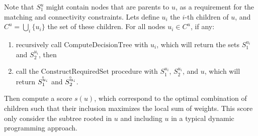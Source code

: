 			Note that $S^u_1$ might contain nodes that are parents to $u$, as a requirement for the matching and connectivity constraints.
			Lets define $u_i$ the $i$-th children of $u$, and $C^u = \bigcup\limits_i{\{u_i\}}$ the set of these children. %
			For all nodes $u_i \in C^u$, if any:
			\begin{enumerate}
				\item recursively call $\text{ComputeDecisionTree}$ with $u_i$, which will return the sets $S^{u_i}_1$ and $S^{u_i}_2$, then
				\item call the $\text{ConstructRequiredSet}$ procedure with $S^{u_i}_1$, $S^{u_i}_2$, and $u$, which will return $\accentset{\circ}{S^{u_i}_1}$ and $\accentset{\circ}{S^{u_i}_2}$.
			\end{enumerate} 
			Then compute a score $s(u)$, which correspond to the optimal combination of children such that their inclusion maximizes the local sum of weights.
			This score only consider the subtree rooted in $u$ and including $u$ in a typical dynamic programming approach.

